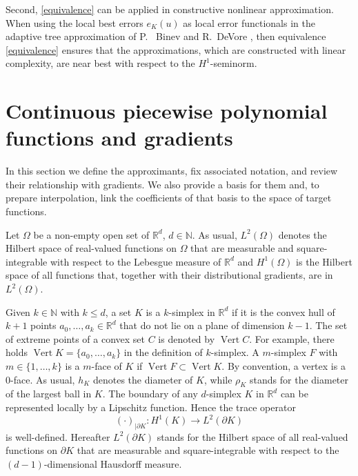 \documentclass[a4paper]{amsart}
\numberwithin{equation}{section}
\theoremstyle{plain}
\theoremstyle{definition}
\begin{document}
Second, \eqref{equivalence} can be applied in constructive nonlinear 
approximation.  When using the local best errors $e_{K}(u)$ as local error 
functionals in the adaptive tree approximation of P.~ Binev and R.~DeVore 
\cite{Binev.DeVore:04}, then equivalence \eqref{equivalence} ensures that the 
approximations, which are constructed with linear complexity, are near best 
with respect to the $H^1$-seminorm. 

\section{Continuous piecewise polynomial functions and gradients}
\label{S:Poly}
In this section we define the approximants, fix associated notation, and review 
their relationship with gradients.  We also provide a basis for them and, to 
prepare interpolation, link the coefficients of that basis to the space of 
target functions.

\bigskip Let $\Omega$ be a non-empty open set of ${{\mathbb{R}}^d}$, $d\in{\mathbb{N}}$.  As usual, 
${L^{{2}}}(\Omega)$ denotes the Hilbert space of real-valued functions on 
$\Omega$ that are measurable and square-integrable with respect to the Lebesgue 
measure of ${{\mathbb{R}}^d}$ and ${H^{{1}}}(\Omega)$ is the Hilbert space of all functions 
that, together with their distributional gradients, are in ${L^{{2}}}(\Omega)$.

Given $k\in{\mathbb{N}}$ with $k\leq d$, a set ${K}$ is a $k$-simplex in ${{\mathbb{R}}^d}$ if it 
is the convex hull of $k+1$ points $a_0,\dots,a_k\in{{\mathbb{R}}^d}$ that do not lie
on a plane of dimension $k-1$.  The set of extreme points of a convex set $C$ 
is denoted by $\operatorname{Vert} C$.  For example, there holds 
$\operatorname{Vert}{K} = \{a_0,\dots,a_k\}$ in the definition of $k$-simplex.  A 
$m$-simplex ${F}$ with $m\in\{1,\dots,k\}$ is a $m$-face of ${K}$ if 
$\operatorname{Vert}{F} \subset \operatorname{Vert}{K}$. By convention, a vertex is a 
$0$-face.  As usual, $h_{K}$ denotes the diameter of ${K}$, while 
$\rho_{K}$ stands for the diameter of the largest ball in ${K}$. The 
boundary of any $d$-simplex ${K}$ in ${{\mathbb{R}}^d}$ can be represented locally by a 
Lipschitz function.  Hence the trace operator 
\begin{equation}
\label{TraceOp}
 (\cdot)_{|\partial{K}}:{H^{{1}}}({K})\to{L^{{2}}}(\partial{K})
\end{equation}
is well-defined.  Hereafter ${L^{{2}}}(\partial{K})$ stands for the
Hilbert space of all real-valued functions on $\partial{K}$ that
are measurable and square-integrable with respect to the
$(d-1)$-dimensional Hausdorff measure.
\end{document}
